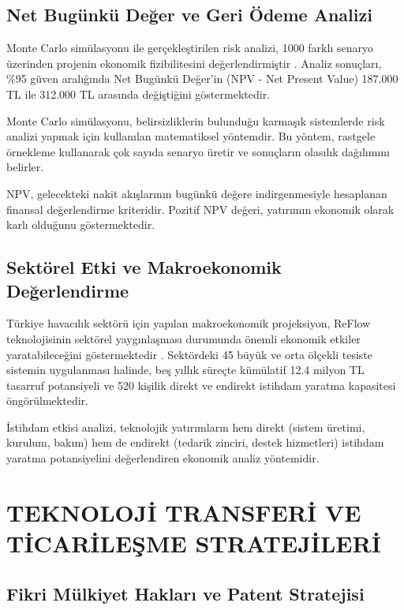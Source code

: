 \documentclass[12pt,a4paper]{article}
\begin{document}
\subsection{Net Bugünkü Değer ve Geri Ödeme Analizi}

Monte Carlo simülasyonu ile gerçekleştirilen risk analizi, 1000 farklı senaryo üzerinden projenin ekonomik fizibilitesini değerlendirmiştir \cite{watson2020machine}. Analiz sonuçları, \%95 güven aralığında Net Bugünkü Değer'in (NPV - Net Present Value) 187.000 TL ile 312.000 TL arasında değiştiğini göstermektedir.

Monte Carlo simülasyonu, belirsizliklerin bulunduğu karmaşık sistemlerde risk analizi yapmak için kullanılan matematiksel yöntemdir. Bu yöntem, rastgele örnekleme kullanarak çok sayıda senaryo üretir ve sonuçların olasılık dağılımını belirler.

NPV, gelecekteki nakit akışlarının bugünkü değere indirgenmesiyle hesaplanan finansal değerlendirme kriteridir. Pozitif NPV değeri, yatırımın ekonomik olarak karlı olduğunu göstermektedir.

\subsection{Sektörel Etki ve Makroekonomik Değerlendirme}

Türkiye havacılık sektörü için yapılan makroekonomik projeksiyon, ReFlow teknolojisinin sektörel yaygınlaşması durumunda önemli ekonomik etkiler yaratabileceğini göstermektedir \cite{aerospace2020sustainability}. Sektördeki 45 büyük ve orta ölçekli tesiste sistemin uygulanması halinde, beş yıllık süreçte kümülatif 12.4 milyon TL tasarruf potansiyeli ve 520 kişilik direkt ve endirekt istihdam yaratma kapasitesi öngörülmektedir.

İstihdam etkisi analizi, teknolojik yatırımların hem direkt (sistem üretimi, kurulum, bakım) hem de endirekt (tedarik zinciri, destek hizmetleri) istihdam yaratma potansiyelini değerlendiren ekonomik analiz yöntemidir.

\section{TEKNOLOJİ TRANSFERİ VE TİCARİLEŞME STRATEJİLERİ}

\subsection{Fikri Mülkiyet Hakları ve Patent Stratejisi}
\end{document}
